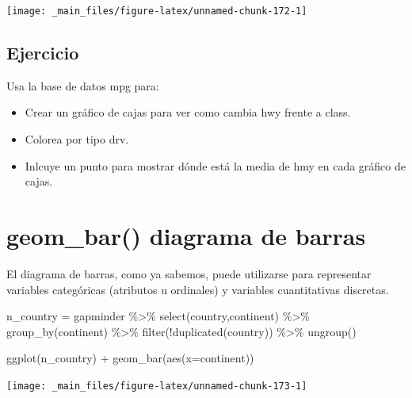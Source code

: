 \documentclass[
]{book}
\newenvironment{Shaded}{\begin{snugshade}}{\end{snugshade}}
\newcommand{\AttributeTok}[1]{\textcolor[rgb]{0.77,0.63,0.00}{#1}}
\newcommand{\FunctionTok}[1]{\textcolor[rgb]{0.00,0.00,0.00}{#1}}
\newcommand{\NormalTok}[1]{#1}
\newcommand{\OtherTok}[1]{\textcolor[rgb]{0.56,0.35,0.01}{#1}}
\newcommand{\SpecialCharTok}[1]{\textcolor[rgb]{0.00,0.00,0.00}{#1}}
\providecommand{\tightlist}{%
  \setlength{\itemsep}{0pt}\setlength{\parskip}{0pt}}
\begin{document}
\begin{center}\texttt{[image: \_main\_files/figure-latex/unnamed-chunk-172-1]} \end{center}

\hypertarget{ejercicio-3}{%
\subsection{Ejercicio}\label{ejercicio-3}}

Usa la base de datos mpg para:

\begin{itemize}
\tightlist
\item
  Crear un gráfico de cajas para ver como cambia hwy frente a class.
\item
  Colorea por tipo drv.
\item
  Inlcuye un punto para mostrar dónde está la media de hmy en cada gráfico de cajas.
\end{itemize}

\hypertarget{geom_bar-diagrama-de-barras}{%
\section{geom\_bar() diagrama de barras}\label{geom_bar-diagrama-de-barras}}

El diagrama de barras, como ya sabemos, puede utilizarse para representar variables categóricas (atributos u ordinales) y variables cuantitativas discretas.

\begin{Shaded}
\begin{Highlighting}[]
\NormalTok{n\_country }\OtherTok{=}\NormalTok{ gapminder }\SpecialCharTok{\%\textgreater{}\%} 
  \FunctionTok{select}\NormalTok{(country,continent) }\SpecialCharTok{\%\textgreater{}\%}
  \FunctionTok{group\_by}\NormalTok{(continent) }\SpecialCharTok{\%\textgreater{}\%} 
  \FunctionTok{filter}\NormalTok{(}\SpecialCharTok{!}\FunctionTok{duplicated}\NormalTok{(country)) }\SpecialCharTok{\%\textgreater{}\%} 
  \FunctionTok{ungroup}\NormalTok{()}

\FunctionTok{ggplot}\NormalTok{(n\_country) }\SpecialCharTok{+} 
  \FunctionTok{geom\_bar}\NormalTok{(}\FunctionTok{aes}\NormalTok{(}\AttributeTok{x=}\NormalTok{continent))}
\end{Highlighting}
\end{Shaded}

\begin{center}\texttt{[image: \_main\_files/figure-latex/unnamed-chunk-173-1]} \end{center}
\end{document}
